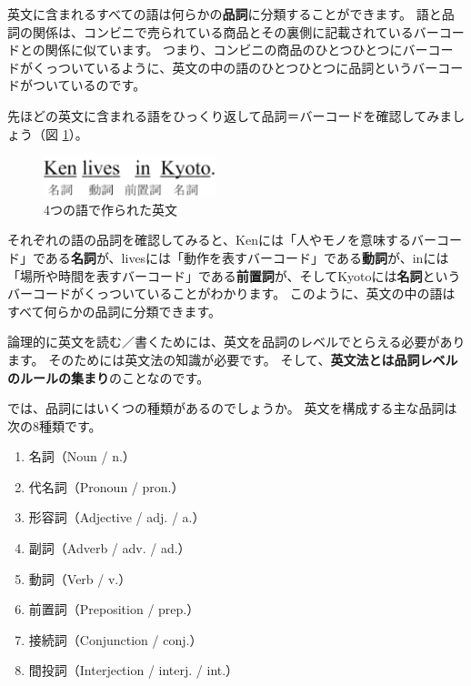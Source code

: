 \documentclass[12pt,titlepage]{jsarticle}
\begin{document}
 英文に含まれるすべての語は何らかの{\bf 品詞}に分類することができます。
 語と品詞の関係は、コンビニで売られている商品とその裏側に記載されているバーコードとの関係に似ています。
 つまり、コンビニの商品のひとつひとつにバーコードがくっついているように、英文の中の語のひとつひとつに品詞というバーコードがついているのです。

 先ほどの英文に含まれる語をひっくり返して品詞＝バーコードを確認してみましょう（図 \ref{fig2}）。

 \begin{figure}[htbp]
  \begin{center}
   \includegraphics[width=5cm]{./figure/fig2.pdf}
   \caption{4つの語で作られた英文}
   \label{fig2}
  \end{center}
 \end{figure}


 それぞれの語の品詞を確認してみると、Kenには「人やモノを意味するバーコード」である{\bf 名詞}が、livesには「動作を表すバーコード」である{\bf 動詞}が、inには「場所や時間を表すバーコード」である{\bf 前置詞}が、そしてKyotoには{\bf 名詞}というバーコードがくっついていることがわかります。
 このように、英文の中の語はすべて何らかの品詞に分類できます。
 
 論理的に英文を読む／書くためには、英文を品詞のレベルでとらえる必要があります。
 そのためには英文法の知識が必要です。
 そして、{\bf 英文法とは品詞レベルのルールの集まり}のことなのです。

 では、品詞にはいくつの種類があるのでしょうか。
 英文を構成する主な品詞は次の8種類です。

 \begin{enumerate}
  \item 名詞（Noun / n.）
  \item 代名詞（Pronoun / pron.）
  \item 形容詞（Adjective / adj. / a.）
  \item 副詞（Adverb / adv. / ad.）
  \item 動詞（Verb / v.）
  \item 前置詞（Preposition / prep.）
  \item 接続詞（Conjunction / conj.）
  \item 間投詞（Interjection / interj. / int.）
 \end{enumerate}
 
\end{document}
